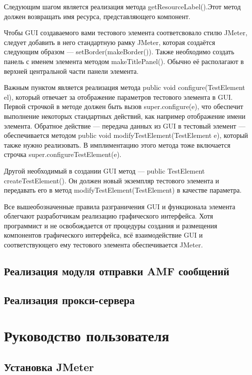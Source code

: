 Следующим шагом является реализация метода getResourceLabel().Этот метод должен возвращать имя ресурса,
представляющего компонент.

Чтобы GUI создаваемого вами тестового элемента соответсвовало стилю JMeter, следует добавить в него стандартную
рамку JMeter, которая создаётся следующим образом --- setBorder(makeBorder()). Также необходимо создать
панель с именем элемента методом makeTitlePanel(). Обычно её располагают в верхней центральной части панели
элемента.

Важным пунктом является реализация метода public void configure(TestElement el), который отвечает за отображение
параметров тестового элемента в GUI. Первой строчкой в методе должен быть вызов super.configure(e), что обеспечит
выполнение некоторых стандартных действий, как например отображение имени элемента. Обратное действие ---
передача данных из GUI в тестовый элемент --- обеспечивается методом public void modifyTestElement(TestElement e),
который также нужно реализовать. В имплиментацию этого метода тоже включается строчка
super.configureTestElement(e).

Другой необходимый в создании GUI метод --- public TestElement createTestElement(). Он должен новый экземпляр
тестового элемента и передавать его в метод modifyTestElement(TestElement) в качестве параметра.

Все вышеобозначенные правила разграничения GUI и функционала элемента облегчают разработчикам реализацию графического
интерфейса. Хотя программист и не освобождается от процедуры создания и размещения компонентов графического
интерфейса, всё взаимодействие GUI и соответствующего ему тестового элемента обеспечивается JMeter.

\subsection{Реализация модуля отправки AMF сообщений}



\subsection{Реализация прокси-сервера}

\section{Руководство пользователя}

\subsection{Установка JMeter}

